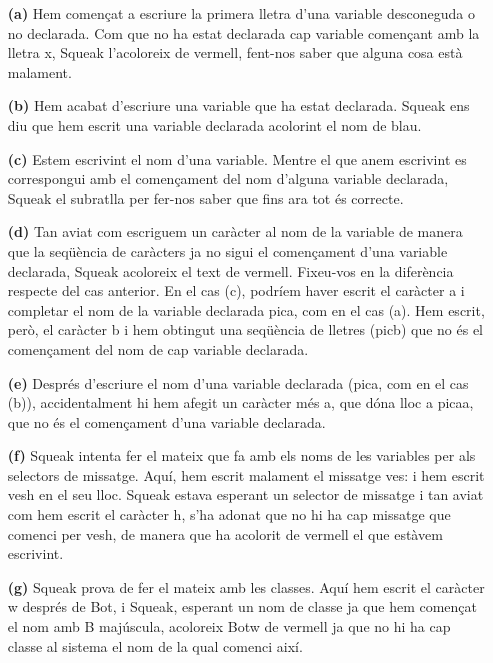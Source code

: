 \begin{itemize}
\item[\textbf{(a)}] Hem començat a escriure la primera lletra d'una variable desconeguda o no declarada. Com que no ha estat declarada cap variable començant amb la lletra x, Squeak l'acoloreix de vermell, fent-nos saber que alguna cosa està malament.
\item[\textbf{(b)}] Hem acabat d'escriure una variable que ha estat declarada. Squeak ens diu que hem escrit una variable declarada acolorint el nom de blau.
\item[\textbf{(c)}] Estem escrivint el nom d'una variable. Mentre el que anem escrivint es correspongui amb el començament del nom d'alguna variable declarada, Squeak el subratlla per fer-nos saber que fins ara tot és correcte.
\item[\textbf{(d)}] Tan aviat com escriguem un caràcter al nom de la variable de manera que la seqüència de caràcters ja no sigui el començament d'una variable declarada, Squeak acoloreix el text de vermell. Fixeu-vos en la diferència respecte del cas anterior. En el cas (c), podríem haver escrit el caràcter \textsf{a} i completar el nom de  la variable declarada \textsf{pica}, com en el cas (a). Hem escrit, però, el caràcter \textsf{b} i hem obtingut una seqüència de lletres (\textsf{picb}) que no és el començament del nom de cap variable declarada.
\item[\textbf{(e)}] Després d'escriure el nom d'una variable declarada (\textsf{pica}, com en el cas (b)), accidentalment hi hem afegit un caràcter més \textsf{a}, que dóna lloc a \textsf{picaa}, que no és el començament d'una variable declarada.
\item[\textbf{(f)}] Squeak intenta fer el mateix que fa amb els noms de les variables per als selectors de missatge. Aquí, hem escrit malament el missatge \textsf{ves:} i hem escrit \textsf{vesh} en el seu lloc. Squeak estava esperant un selector de missatge i tan aviat com hem escrit el caràcter \textsf{h}, s'ha adonat que no hi ha cap missatge que comenci per \textsf{vesh}, de manera que ha acolorit de vermell el que  estàvem escrivint.
\item[\textbf{(g)}] Squeak prova de fer el mateix amb les classes. Aquí hem escrit el caràcter \textsf{w} després de \textsf{Bot}, i Squeak, esperant un nom de classe ja que hem començat el nom amb \textsf{B} majúscula, acoloreix \textsf{Botw} de vermell ja que no hi ha cap classe al sistema el nom de la qual comenci així.
\end{itemize}

